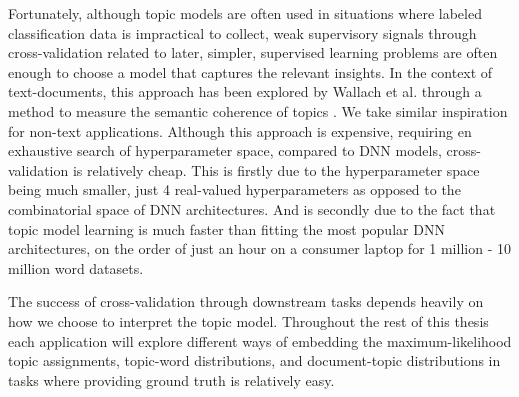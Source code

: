 Fortunately, although topic models are often used in situations where labeled classification data is impractical to collect, weak supervisory signals through cross-validation related to later, simpler, supervised learning problems are often enough to choose a model that captures the relevant insights. In the context of text-documents, this approach has been explored by Wallach et al. through a method to measure the semantic coherence of topics \citep{Wallach2009}. We take similar inspiration for non-text applications. Although this approach is expensive, requiring en exhaustive search of hyperparameter space, compared to DNN models, cross-validation is relatively cheap. This is firstly due to the hyperparameter space being much smaller, just 4 real-valued hyperparameters as opposed to the combinatorial space of DNN architectures. And is secondly due to the fact that topic model learning is much faster than fitting the most popular DNN architectures, on the order of just an hour on a consumer laptop for 1 million - 10 million word datasets.

The success of cross-validation through downstream tasks depends heavily on how we choose to interpret the topic model. Throughout the rest of this thesis each application will explore different ways of embedding the maximum-likelihood topic assignments, topic-word distributions, and document-topic distributions in tasks where providing ground truth is relatively easy.